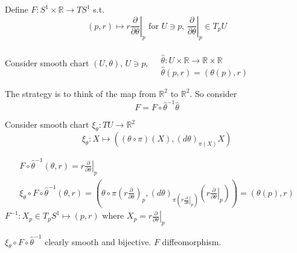 Define $F: S^1 \times \mathbb{R} \to TS^1$ s.t. 
\[
(p,r) \mapsto r \left. \frac{ \partial }{ \partial \theta } \right|_p \text{ for } U\ni p, \, \left. \frac{ \partial }{ \partial \theta}\right|_p \in T_pU
\]

Consider smooth chart $(U,\theta)$, $U\ni p$, $\begin{aligned} & \quad \\
  & \widehat{\theta}:U\times \mathbb{R} \to \mathbb{R}\times \mathbb{R} \\
  & \widehat{\theta}(p,r)  = (\theta(p),r) \end{aligned}$ 

The strategy is to think of the map from $\mathbb{R}^2$ to $\mathbb{R}^2$.  So consider
\[
F=F\circ \widehat{\theta}^{-1}\widehat{\theta}
\]

Consider smooth chart $\xi_{\theta}:TU \to \mathbb{R}^2$  
\[
\xi_{\theta}:X \mapsto ((\theta \circ \pi)(X), (d\theta)_{\pi(X)}X)
\]

\[
\begin{gathered}
  F\circ \widehat{\theta}^{-1}(\theta,r) = r \left. \frac{ \partial }{ \partial \theta }\right|_p \\ 
\xi_{\theta} \circ F\circ \widehat{\theta}^{-1}(\theta,r) = \left( \theta\circ \pi \left( r \frac{ \partial }{ \partial \theta }\right)_p , (d\theta)_{\pi(r\left. \frac{ \partial }{ \partial \theta }\right|_p ) }\left( \left. r \frac{ \partial }{ \partial \theta }\right|_p  \right) \right)= (\theta(p),r)
\end{gathered}
\]
$F^{-1}:X_p \in T_pS^1 \mapsto (p,r)$ where $X_p = \left. r\frac{ \partial }{ \partial \theta }\right|_p$

$\xi_{\theta}\circ F \circ \widehat{\theta}^{-1}$ clearly smooth and bijective.  $F$ diffeomorphism.  

